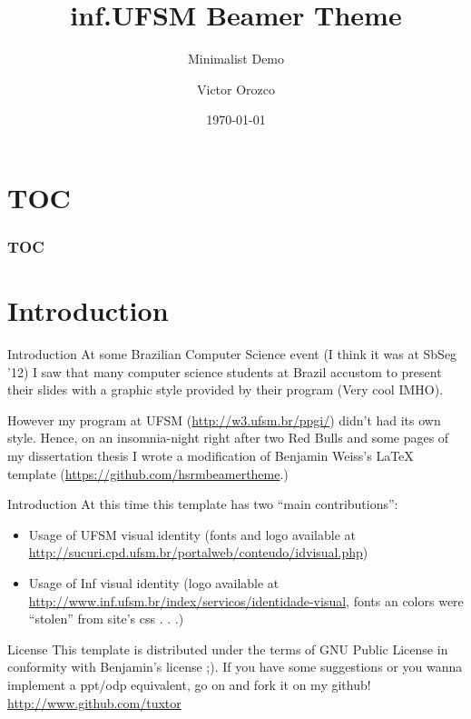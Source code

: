 \documentclass{beamer}
\title{inf.UFSM Beamer Theme}
\subtitle{Minimalist Demo}
\author{Victor Orozco}
\institute{{\Medium PPGI} UFSM}
\date{\today}
\begin{document}
\maketitle

\section*{TOC}
\begin{frame}
	\frametitle{TOC}
	\tableofcontents[hideallsubsections]
\end{frame}

\section{Introduction}

\begin{frame}{Introduction}
	At some Brazilian Computer Science event (I think it was at SbSeg '12) I saw that many computer science students at Brazil accustom to present their slides with a graphic style provided by their program (Very cool IMHO).
	 
	However my program at UFSM (\url{http://w3.ufsm.br/ppgi/}) didn't had its own style. Hence, on an insomnia-night right after two Red Bulls and some pages of my dissertation thesis I wrote a modification of Benjamin Weiss's LaTeX template (\url{https://github.com/hsrmbeamertheme}.)
\end{frame}
	
\begin{frame}{Introduction}
	At this time this template has two ``main contributions'':
	
	\begin{itemize}
	\item Usage of UFSM visual identity (fonts and logo available at \url{http://sucuri.cpd.ufsm.br/portalweb/conteudo/idvisual.php})
	\item Usage of Inf visual identity (logo available at \url{http://www.inf.ufsm.br/index/servicos/identidade-visual}, fonts an colors were ``stolen'' from site's css . . .)
	\end{itemize}
\end{frame}

\begin{frame}{License}
	This template is distributed under the terms of GNU Public License in conformity with Benjamin's license ;). If you have some suggestions or you wanna implement a ppt/odp equivalent, go on and fork it on my github! \url{http://www.github.com/tuxtor}
\end{frame}
\end{document}
